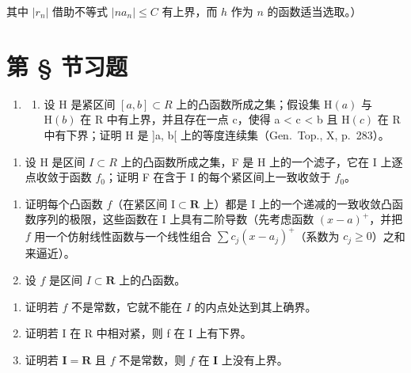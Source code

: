 其中 \(|r_n|\) 借助不等式 \(|na_n| \leqslant C\) 有上界，而 \(h\) 作为 \(n\) 的函数适当选取。）

\setcounter{exercisegroup}{3}
\section*{第 \S{} 节习题}
{}

\begin{enumerate}
\def\labelenumi{\arabic{enumi})}
\tightlist
\item
  \begin{enumerate}
  \def\labelenumii{\alph{enumii})}
  \tightlist
  \item
    设 H 是紧区间 \([a, b] \subset R\) 上的凸函数所成之集；假设集 \(\mathrm{H}(a)\) 与 \(\mathrm{H}(b)\) 在 R 中有上界，并且存在一点 c，使得 a \textless{} c \textless{} b 且 \(\mathrm{H}(c)\) 在 R 中有下界；证明 H 是 {]}a, b{[} 上的等度连续集（Gen.~Top., X, p.~283）。
  \end{enumerate}
\end{enumerate}

\begin{enumerate}
\def\labelenumi{\alph{enumi})}
\setcounter{enumi}{1}
\tightlist
\item
  设 H 是区间 \(I \subset R\) 上的凸函数所成之集，F 是 H 上的一个滤子，它在 I 上逐点收敛于函数 \(f_{0}\)；证明 F 在含于 I 的每个紧区间上一致收敛于 \(f_{0}\)。
\end{enumerate}

\begin{enumerate}
\def\labelenumi{\arabic{enumi})}
\setcounter{enumi}{1}
\item
  证明每个凸函数 \(f\)（在紧区间 \(\mathrm{I} \subset \mathbf{R}\) 上）都是 \(\mathrm{I}\) 上的一个递减的一致收敛凸函数序列的极限，这些函数在 \(\mathrm{I}\) 上具有二阶导数（先考虑函数 \((x - a)^+\)，并把 \(f\) 用一个仿射线性函数与一个线性组合 \(\sum c_j(x - a_j)^+\)（系数为 \(c_j \geqslant 0\)）之和来逼近）。
\item
  设 \(f\) 是区间 \(I \subset \mathbf{R}\) 上的凸函数。
\end{enumerate}

\begin{enumerate}
\def\labelenumi{\alph{enumi})}
\item
  证明若 \(f\) 不是常数，它就不能在 \(I\) 的内点处达到其上确界。
\item
  证明若 I 在 R 中相对紧，则 f 在 I 上有下界。
\item
  证明若 \(\mathbf{I} = \mathbf{R}\) 且 \(f\) 不是常数，则 \(f\) 在 \(\mathbf{I}\) 上没有上界。
\end{enumerate}

